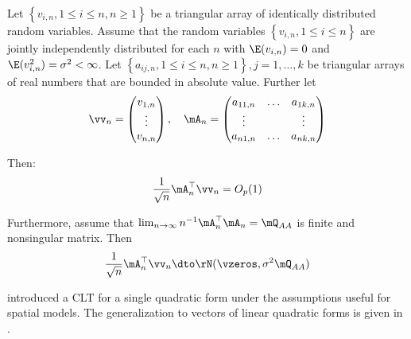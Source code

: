\documentclass[english,12pt]{book}\usepackage[]{graphicx}\usepackage[]{xcolor}
\begin{document}
\begin{theorem}\label{teo:CLT_tri_arr}
Let $\left\lbrace v_{i,n}, 1 \leq i \leq n, n\geq 1\right\rbrace $ be a triangular array of identically distributed random variables. Assume that the random variables $\left\lbrace v_{i,n}, 1 \leq i \leq n\right\rbrace$ are jointly independently distributed for each $n$ with $\E(v_{i,n})= 0$ and $\E(v_{i,n}^2) = \sigma^2 < \infty$. Let $\left\lbrace a_{ij,n}, 1 \leq i \leq n, n\geq 1\right\rbrace, j = 1,\ldots,k$ be triangular arrays of real numbers that are bounded in absolute value. Further let
\begin{equation*}
  \vv_n = \begin{pmatrix}
            v_{1, n} \\
            \vdots \\
            v_{n,n}
          \end{pmatrix}, \quad
          \mA_n = \begin{pmatrix}
            a_{11,n} & \hdots & a_{1k, n} \\
            \vdots &         & \vdots \\
            a_{n1,n} & \hdots & a_{nk, n}
          \end{pmatrix}
\end{equation*}

Then:
\begin{equation*}
\frac{1}{\sqrt{n}}\mA_n^\top\vv_n = O_p(1)
\end{equation*}

Furthermore, assume that $\lim_{n\to\infty}n^{-1}\mA^\top_n\mA_n = \mQ_{AA}$ is finite and nonsingular matrix. Then
\begin{equation*}
\frac{1}{\sqrt{n}}\mA_n^\top\vv_n \dto \rN(\vzeros, \sigma^2 \mQ_{AA})
\end{equation*}
\end{theorem}

\cite{kelejian2001asymptotic} introduced a CLT for a single quadratic form under the assumptions useful for spatial models. The generalization to vectors of linear quadratic forms is given in \cite{kelejian2010specification}.
\end{document}
